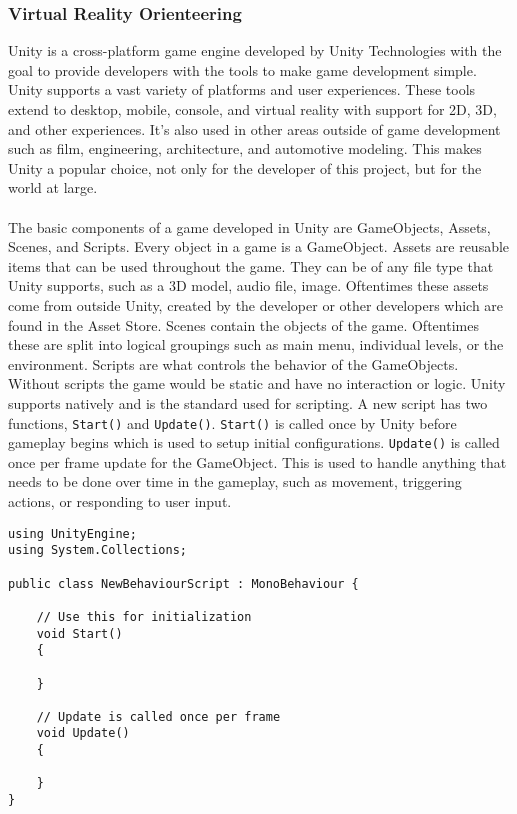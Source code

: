 \subsubsection{Virtual Reality Orienteering}
Unity is a cross-platform game engine developed by Unity Technologies with the goal to provide developers with the tools to make game development simple. Unity supports a vast variety of platforms and user experiences. These tools extend to desktop, mobile, console, and virtual reality with support for 2D, 3D, and other experiences. It's also used in other areas outside of game development such as film, engineering, architecture, and automotive modeling. This makes Unity a popular choice, not only for the developer of this project, but for the world at large.  \\
\\
The basic components of a game developed in Unity are GameObjects, Assets, Scenes, and Scripts. Every object in a game is a GameObject. Assets are reusable items that can be used throughout the game. They can be of any file type that Unity supports, such as a 3D model, audio file, image. Oftentimes these assets come from outside Unity, created by the developer or other developers which are found in the Asset Store. Scenes contain the objects of the game. Oftentimes these are split into logical groupings such as main menu, individual levels, or the environment. Scripts are what controls the behavior of the GameObjects. Without scripts the game would be static and have no interaction or logic. Unity supports \C natively and is the standard used for scripting. A new script has two functions, \lstinline{Start()} and \lstinline{Update()}. \lstinline{Start()} is called once by Unity before gameplay begins which is used to setup initial configurations. \lstinline{Update()} is called once per frame update for the GameObject. This is used to handle anything that needs to be done over time in the gameplay, such as movement, triggering actions, or responding to user input.  

\begin{lstlisting}[caption=New Script in Unity]
using UnityEngine;
using System.Collections;

public class NewBehaviourScript : MonoBehaviour {

	// Use this for initialization
	void Start()
	{
	
	}
	
	// Update is called once per frame
	void Update() 
	{
	
	}
}
\end{lstlisting}

